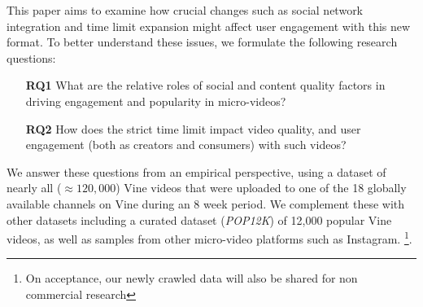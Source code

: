 This paper aims to examine how  crucial changes such as social network integration and time limit expansion might affect user engagement with this new format. 
To better understand these issues, we formulate the following research questions: 



\begin{itemize}
\item[\textbf{RQ1}] What are the relative roles of  social and content quality factors in driving engagement and popularity in micro-videos?
\item[\textbf{RQ2}] How does the strict time limit impact video quality, and user engagement (both as creators and consumers) with such videos? %
\end{itemize}

We answer these questions from an empirical perspective, using a dataset of nearly all ($\approx 120,000$) Vine videos that were uploaded to one of the 18 globally available channels on Vine during an 8 week period. We complement these with other datasets including a curated dataset (\emph{POP12K}) of 12,000 popular Vine videos, as well as samples from other micro-video platforms such as Instagram. \footnote{On acceptance, our newly crawled data will also be shared  for non commercial research}. 
 
 

